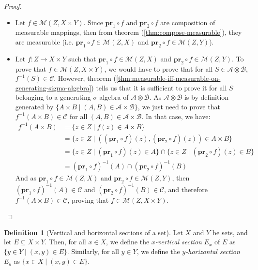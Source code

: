 \documentclass{article}
\theoremstyle{definition}
\newtheorem{definition}{Definition}[section]
\theoremstyle{remark}
\theoremstyle{example}
\theoremstyle{notation}
\newcommand{\pr}{\mathbf{pr}}
\begin{document}
\begin{proof}~
		\begin{itemize}
				\item Let $f \in \mathcal{M}(Z, X \times Y)$. Since $\pr_1 \circ f$ and $\pr_2 \circ f$ are composition of measurable mappings, then from theorem (\ref{thm:compose-measurable}), they are measurable (i.e. $\pr_1 \circ f \in \mathcal{M}(Z, X)$ and $\pr_2 \circ f \in \mathcal{M}(Z, Y)$).
				\item Let $f : Z \rightarrow X \times Y$ such that $\pr_1 \circ f \in \mathcal{M}(Z, X)$ and $\pr_2 \circ f \in \mathcal{M}(Z, Y)$. To prove that $f \in \mathcal{M}(Z, X \times Y)$, we would have to prove that for all $S \in \mathcal{A} \otimes \mathcal{B}$, $f^{-1}(S) \in \mathcal{C}$. However, theorem (\ref{thm:measurable-iff-measurable-on-generating-sigma-algebra}) tells us that it is sufficient to prove it for all $S$ belonging to a generating $\sigma$-algebra of $\mathcal{A} \otimes \mathcal{B}$. As $\mathcal{A} \otimes \mathcal{B}$ is by definition generated by $\{A \times B \mid (A, B) \in \mathcal{A} \times \mathcal{B}\}$, we just need to prove that $f^{-1}(A \times B) \in \mathcal{C}$ for all $(A, B) \in \mathcal{A} \times \mathcal{B}$. In that case, we have:
				\begin{align*}
						f^{-1}(A \times B) &= \{z \in Z \mid f(z) \in A \times B\}\\
										   &= \{z \in Z \mid ((\pr_1 \circ f)(z), (\pr_2 \circ f)(z)) \in A \times B\}\\
										   &= \{z \in Z \mid (\pr_1 \circ f)(z) \in A\} \cap \{z \in Z \mid (\pr_2 \circ f)(z) \in B\}\\
										   &= (\pr_1 \circ f)^{-1}(A) \cap (\pr_2 \circ f)^{-1}(B)
				\end{align*}
						And as $\pr_1 \circ f \in \mathcal{M}(Z, X)$ and $\pr_2 \circ f \in \mathcal{M}(Z, Y)$, then $(\pr_1 \circ f)^{-1}(A) \in \mathcal{C}$ and $(\pr_2 \circ f)^{-1}(B) \in \mathcal{C}$, and therefore $f^{-1}(A \times B) \in \mathcal{C}$, proving that $f \in \mathcal{M}(Z, X \times Y)$.
		\end{itemize}
\end{proof}

\begin{definition}[Vertical and horizontal sections of a set]%
		Let $X$ and $Y$ be sets, and let $E \subseteq X \times Y$. Then, for all $x \in X$, we define the \textit{$x$-vertical section} $E_x$ of $E$ as $\{y \in Y \mid (x, y) \in E\}$. Similarly, for all $y \in Y$, we define the \textit{$y$-horizontal section} $E_y$ as $\{x \in X \mid (x, y) \in E\}$.
\end{definition}
\end{document}

